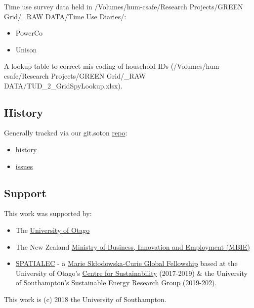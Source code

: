 \documentclass[]{article}
\providecommand{\tightlist}{%
  \setlength{\itemsep}{0pt}\setlength{\parskip}{0pt}}
\begin{document}
Time use survey data held in /Volumes/hum-csafe/Research Projects/GREEN
Grid/\_RAW DATA/Time Use Diaries/:

\begin{itemize}
\tightlist
\item
  PowerCo
\item
  Unison
\end{itemize}

A lookup table to correct mis-coding of household IDs
(/Volumes/hum-csafe/Research Projects/GREEN Grid/\_RAW
DATA/TUD\_2\_GridSpyLookup.xlsx).

\subsection{History}\label{history}

Generally tracked via our git.soton
\href{https://git.soton.ac.uk/ba1e12/nzGREENGrid}{repo}:

\begin{itemize}
\tightlist
\item
  \href{https://git.soton.ac.uk/ba1e12/nzGREENGrid/commits/master}{history}
\item
  \href{https://git.soton.ac.uk/ba1e12/nzGREENGrid/issues}{issues}
\end{itemize}

\subsection{Support}\label{support}

This work was supported by:

\begin{itemize}
\tightlist
\item
  The \href{https://www.otago.ac.nz/}{University of Otago}
\item
  The New Zealand \href{http://www.mbie.govt.nz/}{Ministry of Business,
  Innovation and Employment (MBIE)}
\item
  \href{http://www.energy.soton.ac.uk/tag/spatialec/}{SPATIALEC} - a
  \href{http://ec.europa.eu/research/mariecurieactions/about-msca/actions/if/index_en.htm}{Marie
  Skłodowska-Curie Global Fellowship} based at the University of Otago's
  \href{http://www.otago.ac.nz/centre-sustainability/staff/otago673896.html}{Centre
  for Sustainability} (2017-2019) \& the University of Southampton's
  Sustainable Energy Research Group (2019-202).
\end{itemize}

This work is (c) 2018 the University of Southampton.
\end{document}
